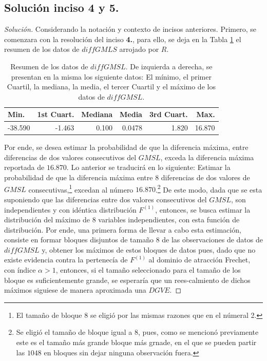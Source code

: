 \documentclass[10.5pt,notitlepage]{article}
\newenvironment{solucion}
  {\begin{proof}[Solución]}
  {\end{proof}}
\theoremstyle{plain}
\begin{document}
\subsection{Solución inciso 4 y 5.}
\begin{solucion}
Considerando la notación y contexto de incisos anteriores. Primero, se comenzara con la resolución del inciso \textbf{4.}, para ello, se deja en la Tabla \ref{tab:31} el resumen de los datos de \(diffGMLS\) arrojado por \(R\).
\begin{table}[H]
        \centering
        \begin{tabular}{@{}l@{\hskip 0.3in}r@{\hskip 0.3in}r@{\hskip 0.3in}r@{\hskip 0.3in}r@{\hskip 0.3in}r@{}}
        \toprule
        Min.&   1st Cuart.&    Mediana&      Media&   3rd Cuart.&      Max. \\
        \midrule         
        -38.590&  -1.463&   0.100&   0.0478&   1.820&  16.870 \\
        \end{tabular}
        \caption{Resumen de los datos de \(diffGMSL\). De izquierda a derecha, se presentan en la misma los siguiente datos: El mínimo, el primer Cuartil, la mediana, la media, el tercer Cuartil y el máximo de los datos de \(diffGMSL\).}
        \label{tab:31}
\end{table} 
Por ende, se desea estimar la probabilidad de que la diferencia máxima, entre diferencias de dos valores consecutivos del \(GMSL\), exceda la diferencia máxima reportada de \(16.870\). Lo anterior se traducirá en lo siguiente: Estimar la probabilidad de que la diferencia máxima entre \(8\) diferencias de dos valores de \(GMSL\) consecutivas,\footnote{El tamaño de bloque \(8\) se eligió por las mismas razones que en el númeral 2.} excedan al número \(16.870\).\footnote{Se eligió el tamaño de bloque igual a \(8\), pues, como se mencionó previamente este es el tamaño más grande bloque más grnade, en el que se pueden partir las \(1048\) en bloques sin dejar ninguna observación fuera.} De este modo, dada que se esta suponiendo que las diferencias entre dos valores consecutivos del \(GMSL\), son independientes y con idéntica distribución \(F^{(1)} \), entonces, se busca estimar la distribución del máximo de \(8\) variables independientes, con esta función de distribución. Por ende, una primera forma de llevar a cabo esta estimación, consiste en formar bloques disjuntos de tamaño \(8\) de las observaciones de datos de \(diffGMSL\) y, obtener los máximos de estos bloques de datos pues, dado que no existe evidencia contra la pertenecía de \(F^{(1)} \) al dominio de atracción Frechet, con índice \(\alpha >1\), entonces, si el tamaño seleccionado para el tamaño de los bloque es suficientemente grande, se esperaría que un rees-calmiento de dichos máximos siguiese de manera aproximada una \(DGVE\). 


\end{solucion}
\end{document}
